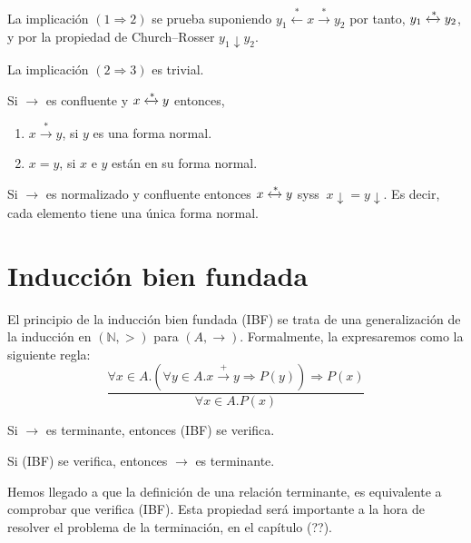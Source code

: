 \begin{demo}
  La implicación $(1 \Rightarrow 2)$ se prueba suponiendo
  $y_1 \xleftarrow{*} x \xrightarrow{*} y_2$ por tanto,
  $y_1 \xleftrightarrow{*} y_2$, y por la propiedad de Church--Rosser
  $y_1 \downarrow y_2$.  

  La implicación $(2 \Rightarrow 3)$ es trivial.
\end{demo}


\begin{coro} 
  Si $\rightarrow$ es confluente y $x \xleftrightarrow{*} y$ entonces,
  \begin{enumerate}
  \item $ x \xrightarrow{*} y$, si $y$ es una forma normal. 
  \item $x=y$, si $x$ e $y$ están en su forma normal.
  \end{enumerate}         
\end{coro}

\begin{teor}
  Si $\rightarrow$ es normalizado y confluente entonces
  $ x \xleftrightarrow{*} y$ syss $\ x \downarrow = y \downarrow$. Es decir,
  cada elemento tiene una única forma normal.
\end{teor}

\section{Inducción bien fundada}

El principio de la inducción bien fundada (IBF) se trata de una generalización
de la inducción en $(\mathbb{N},>)$ para $(A,\rightarrow)$.  Formalmente, la
expresaremos como la siguiente regla:
\begin{equation*}
  \frac{\forall x \in A. (\forall y \in A. x \xrightarrow{+} y \Rightarrow P(y)) \Rightarrow P(x)} 
       {\forall x \in A. P(x)}
\end{equation*}


\begin{teor}  
  Si $\rightarrow$ es terminante, entonces (IBF) se verifica.
\end{teor}

\begin{teor}  
  Si (IBF) se verifica, entonces $\rightarrow$ es terminante.
\end{teor}

Hemos llegado a que la definición de una relación terminante, es equivalente a
comprobar que verifica (IBF). Esta propiedad será importante a la hora de
resolver el problema de la terminación, en el capítulo (??).


